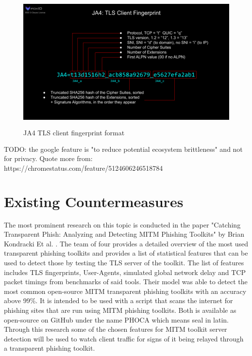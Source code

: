 \documentclass[12pt]{scrbook}
\begin{document}
\begin{figure}[!htb] \centering
  \includegraphics[height=7cm]{./images/JA4.png} \caption{JA4 TLS client
fingerprint format} \end{figure}

TODO: the google feature is "to reduce potential ecosystem brittleness" and
not for privacy. Quote more from:
https://chromestatus.com/feature/5124606246518784

\section{Existing Countermeasures}
The most prominent research on this topic is conducted in the paper "Catching Transparent Phish:
Analyzing and Detecting MITM Phishing Toolkits" by Brian Kondracki Et al. \cite{kondracki2021catching}.
The team of four provides a detailed overview of the most used transparent phishing toolkits and provides
a list of statistical features that can be used to detect those by testing the TLS server of the toolkit.
The list of features includes TLS fingerprints, User-Agents, simulated global network delay and TCP packet timings from benchmarks of said tools.
Their model was able to detect the most common open-source MITM transparent phishing toolkits with an accuracy above 99\%.
It is intended to be used with a script that scans the internet for phishing sites that are run using MITM phishing toolkits.
Both is available as open-source on GitHub under the name PHOCA which means seal in latin.\cite{kondracki2021catchingGit}
Through this research some of the chosen features for MITM toolkit server detection will be used to watch client traffic for signs of it being relayed through a transparent phishing toolkit.
\end{document}
